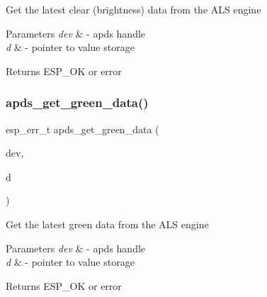 \begin{DoxyItemize}
\item Get the latest clear (brightness) data from the A\+LS engine 
\end{DoxyItemize}


\begin{DoxyParams}{Parameters}
{\em dev} & -\/ apds handle \\
\hline
{\em d} & -\/ pointer to value storage \\
\hline
\end{DoxyParams}
\begin{DoxyReturn}{Returns}
E\+S\+P\+\_\+\+OK or error 
\end{DoxyReturn}
\mbox{\label{group__APDS9960__DataFunctions_ga9ec9895eceb5c721df9908fb9b129c70}} 
\subsubsection{\texorpdfstring{apds\+\_\+get\+\_\+green\+\_\+data()}{apds\_get\_green\_data()}}
{\footnotesize\ttfamily esp\+\_\+err\+\_\+t apds\+\_\+get\+\_\+green\+\_\+data (\begin{DoxyParamCaption}\item[{\hyperlink{structAPDS9960__Driver}{A\+P\+D\+S\+\_\+\+D\+EV}}]{dev,  }\item[{\hyperlink{vl53l0x__types_8h_a273cf69d639a59973b6019625df33e30}{uint16\+\_\+t} $\ast$}]{d }\end{DoxyParamCaption})}




\begin{DoxyItemize}
\item Get the latest green data from the A\+LS engine 
\end{DoxyItemize}


\begin{DoxyParams}{Parameters}
{\em dev} & -\/ apds handle \\
\hline
{\em d} & -\/ pointer to value storage \\
\hline
\end{DoxyParams}
\begin{DoxyReturn}{Returns}
E\+S\+P\+\_\+\+OK or error 
\end{DoxyReturn}
\mbox{\label{group__APDS9960__DataFunctions_ga9d2e3d18bf1d952068582fe97b0c8afa}} 
